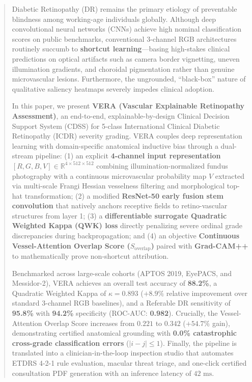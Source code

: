 \documentclass[conference]{IEEEtran}
\begin{document}
\begin{abstract}
Diabetic Retinopathy (DR) remains the primary etiology of preventable blindness among working-age individuals globally. Although deep convolutional neural networks (CNNs) achieve high nominal classification scores on public benchmarks, conventional 3-channel RGB architectures routinely succumb to \textbf{shortcut learning}---basing high-stakes clinical predictions on optical artifacts such as camera border vignetting, uneven illumination gradients, and choroidal pigmentation rather than genuine microvascular lesions. Furthermore, the ungrounded, ``black-box'' nature of qualitative saliency heatmaps severely impedes clinical adoption. 

In this paper, we present \textbf{VERA (Vascular Explainable Retinopathy Assessment)}, an end-to-end, explainable-by-design Clinical Decision Support System (CDSS) for 5-class International Clinical Diabetic Retinopathy (ICDR) severity grading. VERA couples deep representation learning with domain-specific anatomical inductive bias through a dual-stream pipeline: (1) an explicit \textbf{4-channel input representation} $[R, G, B, V] \in \mathbb{R}^{4 \times 512 \times 512}$ combining illumination-normalized fundus photography with a continuous microvascular probability map $V$ extracted via multi-scale Frangi Hessian vesselness filtering and morphological top-hat transformation; (2) a modified \textbf{ResNet-50 early fusion stem convolution} that natively anchors receptive fields to retino-vascular structures from layer 1; (3) a \textbf{differentiable surrogate Quadratic Weighted Kappa (QWK) loss} directly penalizing severe ordinal grade discrepancies during backpropagation; and (4) an objective \textbf{Continuous Vessel-Attention Overlap Score ($S_{\text{overlap}}$)} paired with \textbf{Grad-CAM++} to mathematically prove non-shortcut attribution.

Benchmarked across large-scale cohorts (APTOS 2019, EyePACS, and Messidor-2), VERA achieves an overall test accuracy of \textbf{88.2\%}, a Quadratic Weighted Kappa of \textbf{$\kappa = 0.893$} ($+8.9\%$ relative improvement over standard 3-channel RGB baselines), and a Referable DR sensitivity of \textbf{95.8\%} with \textbf{94.2\%} specificity (ROC-AUC: \textbf{0.982}). Crucially, the Vessel-Attention Overlap Score increases from $0.221$ to \textbf{$0.342$} ($+54.7\%$ gain), demonstrating certified anatomical grounding with \textbf{0.0\% catastrophic cross-grade classification errors} ($|i - j| \le 1$). Finally, the pipeline is translated into a clinician-in-the-loop inspection studio that automates ETDRS 4-2-1 rule evaluation, macular threat triage, and one-click certified consultation PDF generation with an inference latency of $42\text{ ms}$.
\end{abstract}
\end{document}
